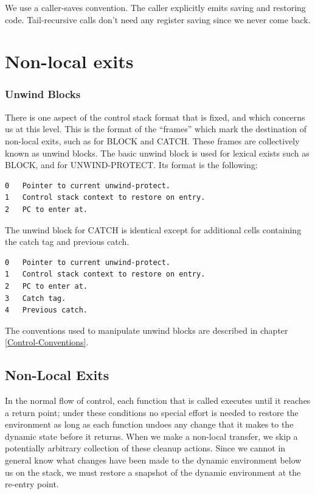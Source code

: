{\begin{itemize, spread 0, spacing 1}
We use a caller-saves convention.  The caller explicitly emits saving and
restoring code.  Tail-recursive calls don't need
any register saving since we never come back.


\chapter{Non-local exits}

\subsection{Unwind Blocks}

There is one aspect of the control stack format that is fixed, and which
concerns us at this level.  This is the format of the ``frames'' which mark the
destination of non-local exits, such as for BLOCK and CATCH.  These frames are
collectively known as unwind blocks.  The basic unwind block is used for
lexical exists such as BLOCK, and for UNWIND-PROTECT.  Its format is the
following:
\begin{verbatim}
0   Pointer to current unwind-protect.
1   Control stack context to restore on entry.
2   PC to enter at.
\end{verbatim}

The unwind block for CATCH is identical except for additional cells
containing the catch tag and previous catch.
\begin{verbatim}
0   Pointer to current unwind-protect.
1   Control stack context to restore on entry.
2   PC to enter at.
3   Catch tag.
4   Previous catch.
\end{verbatim}

The conventions used to manipulate unwind blocks are described in chapter
\ref{Control-Conventions}.


\section{Non-Local Exits}
\label{Catch}

In the normal flow of control, each function that is called executes until it
reaches a return point; under these conditions no special effort is needed to
restore the environment as long as each function undoes any change that it
makes to the dynamic state before it returns.  When we make a non-local
transfer, we skip a potentially arbitrary collection of these cleanup actions.
Since we cannot in general know what changes have been made to the dynamic
environment below us on the stack, we must restore a snapshot of the dynamic
environment at the re-entry point.


\end{itemize, spread 0, spacing 1}}

